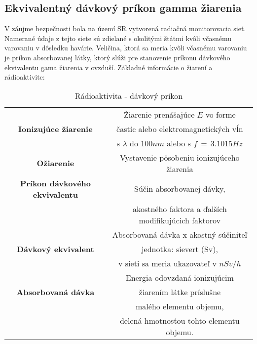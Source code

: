 

\subsection{Ekvivalentný dávkový príkon gamma žiarenia}
V záujme bezpečnosti bola na území SR vytvorená radiačná monitorovacia sieť. Namerané údaje z tejto siete sú zdielané s okolitými štátmi kvôli včasnému varovaniu v dôsledku havárie. Veličina, ktorá sa meria kvôli včasnému varovaniu je príkon absorbovanej látky, ktorý slúži pre stanovenie príkonu dávkového ekvivalentu gama žiarenia v ovzduší. 
Základné informácie o žiarení a rádioaktivite\cite{radioaktivita_shmu}:
\begin{table}[h!]
    \centering
    \begin{tabular}{|c|c|}
        \hline
         &  Žiarenie prenášajúce $E$ vo forme \\
        \textbf{Ionizujúce žiarenie} &častíc alebo elektromagnetických vĺn \\
         &s $\lambda$  do $100 nm$ alebo s $f\,=\,3.1015 Hz$\\
         \hline
        \textbf{Ožiarenie} & Vystavenie pôsobeniu ionizujúceho žiarenia\cite{radioaktivita_pdf} \\
        \hline
        \textbf{Príkon dávkového ekvivalentu} & Súčin absorbovanej dávky, \\
         & akostného faktora a ďalších modifikujúcich faktorov\\
        \hline
         &   Absorbovaná dávka x akostný súčiniteľ \\
         \textbf{Dávkový ekvivalent}& jednotka: sievert (Sv),\\
         & v sieti sa meria ukazovateľ v $nSv/h$\\
         \hline
          & Energia odovzdaná ionizujúcim\\
          \textbf{Absorbovaná dávka} & žiarením látke príslušne \\
           & malého elementu objemu, \\
           & delená hmotnosťou tohto elementu objemu.\\
           \hline
    \end{tabular}
    \caption{Rádioaktivita - dávkový  príkon}
    \label{tab:radioaktivita}
\end{table}
